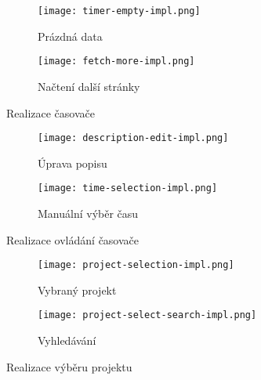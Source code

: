 \begin{figure}[p]
    \centering
    \begin{subfigure}[b]{0.4\textwidth}
		\centering
		\texttt{[image: timer-empty-impl.png]}
		\caption{Prázdná data}
		\label{fig:timer-empty-impl}
	\end{subfigure}
	\hspace{2cm}
	\begin{subfigure}[b]{0.4\textwidth}
		\centering
		\texttt{[image: fetch-more-impl.png]}
		\caption{Načtení další stránky}
		\label{fig:fetch-more-impl}
	\end{subfigure}
	\caption{Realizace časovače}
	\label{fig:timer-impl}
\end{figure}

\begin{figure}[p]
    \centering
    \begin{subfigure}[b]{0.4\textwidth}
		\centering
		\texttt{[image: description-edit-impl.png]}
		\caption{Úprava popisu}
		\label{fig:description-edit-impl}
	\end{subfigure}
	\hspace{2cm}
	\begin{subfigure}[b]{0.4\textwidth}
		\centering
		\texttt{[image: time-selection-impl.png]}
		\caption{Manuální výběr času}
		\label{fig:time-selection-impl}
	\end{subfigure}
	\caption{Realizace ovládání časovače}
	\label{fig:timer-control-impl}
\end{figure}

\begin{figure}[p]
    \centering
    \begin{subfigure}[b]{0.4\textwidth}
		\centering
		\texttt{[image: project-selection-impl.png]}
		\caption{Vybraný projekt}
		\label{fig:selected-project-impl}
	\end{subfigure}
	\hspace{2cm}
	\begin{subfigure}[b]{0.4\textwidth}
		\centering
		\texttt{[image: project-select-search-impl.png]}
		\caption{Vyhledávání}
		\label{fig:project-select-search-impl}
	\end{subfigure}
	\caption{Realizace výběru projektu}
	\label{fig:project-selection-impl}
\end{figure}

